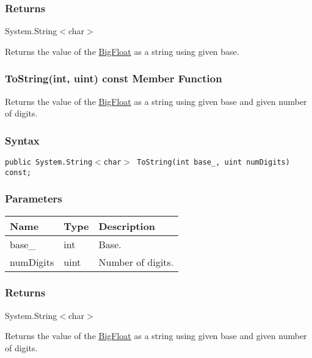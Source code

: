 \documentclass[a4paper,oneside,11.000000pt]{book}
\begin{document}
\subsubsection*{Returns}System.\-String$<$\-char$>$\-
\begin{flushleft}
Returns the value of the \hyperlink{System.Numerics.Multiprecision.BigFloat}{BigFloat} as a string using given base.

\end{flushleft}
\clearpage

\hypertarget{System.Numerics.Multiprecision.BigFloat.ToString.C.P.System.Numerics.Multiprecision.BigFloat.int.uint}{\subsubsection*{ToString(int, uint) const Member Function}}
\begin{flushleft}
Returns the value of the \hyperlink{System.Numerics.Multiprecision.BigFloat}{BigFloat} as a string using given base and given number of digits.

\end{flushleft}
\subsubsection*{Syntax}
\texttt{public System.String$<$char$>$ ToString(int base\_, uint numDigits) const;}
\subsubsection*{Parameters}
\begin{flushleft}
\begin{supertabular}[l]{lll}
\textbf{Name}
& \textbf{Type}
& \textbf{Description}
\\
\hline
base\_
& int
& Base.

\\
numDigits
& uint
& Number of digits.

\\
\end{supertabular}

\end{flushleft}
\subsubsection*{Returns}System.\-String$<$\-char$>$\-
\begin{flushleft}
Returns the value of the \hyperlink{System.Numerics.Multiprecision.BigFloat}{BigFloat} as a string using given base and given number of digits.

\end{flushleft}
\clearpage
\end{document}
